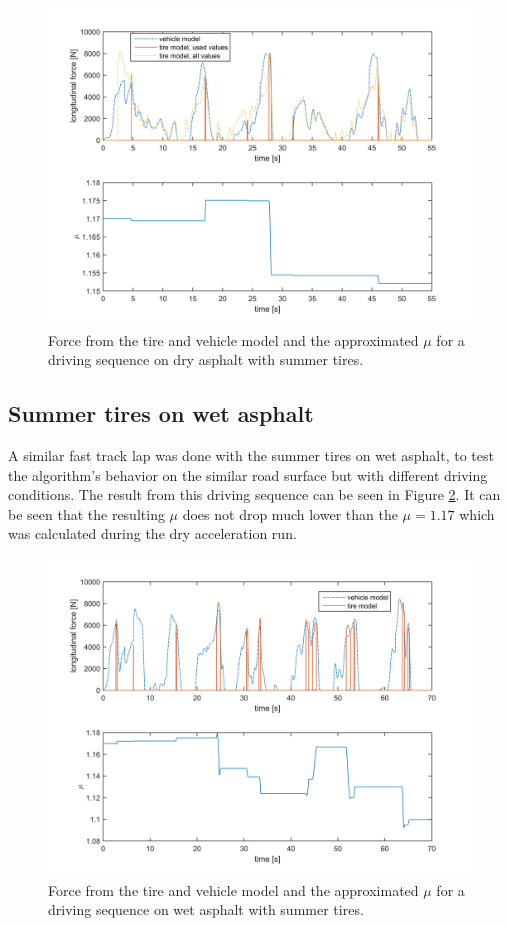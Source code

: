 \begin{figure}[h]
	\centering
	\includegraphics[width=1.0\textwidth]{Pictures/force_mue_race_bb}
	\caption {Force from the tire and vehicle model and the approximated $ \mu $ for a driving sequence on dry asphalt with summer tires.}
	\label{force_mue_race_bb}
\end{figure}

\subsection{Summer tires on wet asphalt}
A similar fast track lap was done with the summer tires on wet asphalt, to test the algorithm's behavior on the similar road surface but with different driving conditions. The result from this driving sequence can be seen in Figure \ref{force_mue_blot_race_bb}. It can be seen that the resulting $ \mu $ does not drop much lower than the $ \mu = 1.17 $ which was calculated during the dry acceleration run. 

\begin{figure}[h]
	\centering
	\includegraphics[width=1.0\textwidth]{Pictures/force_mue_blot_race_bb}
	\caption {Force from the tire and vehicle model and the approximated $ \mu $ for a driving sequence on wet asphalt with summer tires.}
	\label{force_mue_blot_race_bb}
\end{figure}

